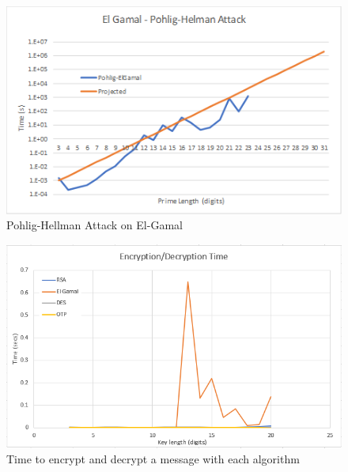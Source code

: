 \documentclass[12pt]{report}
\begin{document}
\begin{figure}[hp!] %
    \begin{center}
        \includegraphics[width=0.85\linewidth]{Pictures/ElGamalPohlig.PNG}
        \caption{Pohlig-Hellman Attack on El-Gamal}
        \label{fig:el-gamal3}
    \end{center}
\end{figure}

\begin{figure}[hp!] %
    \begin{center}
        \includegraphics[width=0.85\linewidth]{Pictures/TransferBenchmarks.png}
        \caption{Time to encrypt and decrypt a message with each algorithm}
        \label{fig:TransferBenchmarks}
    \end{center}
\end{figure}
\FloatBarrier
\end{document}
